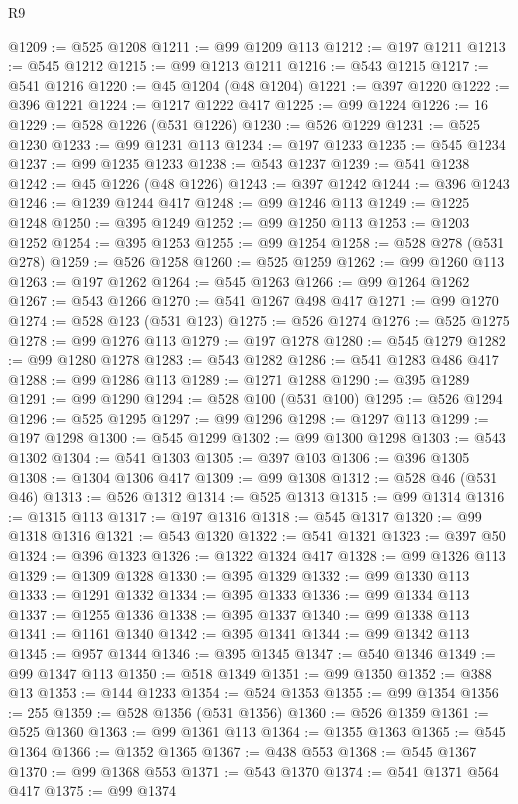 \begin{lexlean}{R9}
\begin{coremodule}
{{{{{{{{{{{{{{{{{{{{{{{{{{{{{{{{{{{{{{{{{{{{{{{{{{{{{{{{{{{{{{{{{{{{{{{{{{{{{{{{{{{{@1209 := @525 @1208
@1211 := @99 @1209 @113
@1212 := @197 @1211
@1213 := @545 @1212
@1215 := @99 @1213 @1211
@1216 := @543 @1215
@1217 := @541 @1216
@1220 := @45 @1204 (@48 @1204)
@1221 := @397 @1220
@1222 := @396 @1221
@1224 := @1217 @1222 @417
@1225 := @99 @1224
@1226 := 16
@1229 := @528 @1226 (@531 @1226)
@1230 := @526 @1229
@1231 := @525 @1230
@1233 := @99 @1231 @113
@1234 := @197 @1233
@1235 := @545 @1234
@1237 := @99 @1235 @1233
@1238 := @543 @1237
@1239 := @541 @1238
@1242 := @45 @1226 (@48 @1226)
@1243 := @397 @1242
@1244 := @396 @1243
@1246 := @1239 @1244 @417
@1248 := @99 @1246 @113
@1249 := @1225 @1248
@1250 := @395 @1249
@1252 := @99 @1250 @113
@1253 := @1203 @1252
@1254 := @395 @1253
@1255 := @99 @1254
@1258 := @528 @278 (@531 @278)
@1259 := @526 @1258
@1260 := @525 @1259
@1262 := @99 @1260 @113
@1263 := @197 @1262
@1264 := @545 @1263
@1266 := @99 @1264 @1262
@1267 := @543 @1266
@1270 := @541 @1267 @498 @417
@1271 := @99 @1270
@1274 := @528 @123 (@531 @123)
@1275 := @526 @1274
@1276 := @525 @1275
@1278 := @99 @1276 @113
@1279 := @197 @1278
@1280 := @545 @1279
@1282 := @99 @1280 @1278
@1283 := @543 @1282
@1286 := @541 @1283 @486 @417
@1288 := @99 @1286 @113
@1289 := @1271 @1288
@1290 := @395 @1289
@1291 := @99 @1290
@1294 := @528 @100 (@531 @100)
@1295 := @526 @1294
@1296 := @525 @1295
@1297 := @99 @1296
@1298 := @1297 @113
@1299 := @197 @1298
@1300 := @545 @1299
@1302 := @99 @1300 @1298
@1303 := @543 @1302
@1304 := @541 @1303
@1305 := @397 @103
@1306 := @396 @1305
@1308 := @1304 @1306 @417
@1309 := @99 @1308
@1312 := @528 @46 (@531 @46)
@1313 := @526 @1312
@1314 := @525 @1313
@1315 := @99 @1314
@1316 := @1315 @113
@1317 := @197 @1316
@1318 := @545 @1317
@1320 := @99 @1318 @1316
@1321 := @543 @1320
@1322 := @541 @1321
@1323 := @397 @50
@1324 := @396 @1323
@1326 := @1322 @1324 @417
@1328 := @99 @1326 @113
@1329 := @1309 @1328
@1330 := @395 @1329
@1332 := @99 @1330 @113
@1333 := @1291 @1332
@1334 := @395 @1333
@1336 := @99 @1334 @113
@1337 := @1255 @1336
@1338 := @395 @1337
@1340 := @99 @1338 @113
@1341 := @1161 @1340
@1342 := @395 @1341
@1344 := @99 @1342 @113
@1345 := @957 @1344
@1346 := @395 @1345
@1347 := @540 @1346
@1349 := @99 @1347 @113
@1350 := @518 @1349
@1351 := @99 @1350
@1352 := @388 @13
@1353 := @144 @1233
@1354 := @524 @1353
@1355 := @99 @1354
@1356 := 255
@1359 := @528 @1356 (@531 @1356)
@1360 := @526 @1359
@1361 := @525 @1360
@1363 := @99 @1361 @113
@1364 := @1355 @1363
@1365 := @545 @1364
@1366 := @1352 @1365
@1367 := @438 @553
@1368 := @545 @1367
@1370 := @99 @1368 @553
@1371 := @543 @1370
@1374 := @541 @1371 @564 @417
@1375 := @99 @1374
}}}}}}}}}}}}}}}}}}}}}}}}}}}}}}}}}}}}}}}}}}}}}}}}}}}}}}}}}}}}}}}}}}}}}}}}}}}}}}}}}}}}
\end{coremodule}
\end{lexlean}
